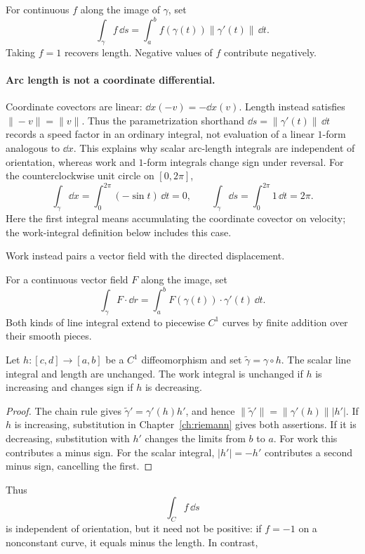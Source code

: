 \begin{definition}
For continuous $f$ along the image of $\gamma$, set
\[
\int_\gamma f\,\dd s
=\int_a^b f(\gamma(t))\|\gamma'(t)\|\,\dd t.
\]
Taking $f=1$ recovers length. Negative values of $f$ contribute negatively.
\end{definition}
\paragraph{Arc length is not a coordinate differential.}
Coordinate covectors are linear: $\dd x(-v)=-\dd x(v)$. Length instead
satisfies $\|-v\|=\|v\|$. Thus the parametrization shorthand
$\dd s=\|\gamma'(t)\|\,\dd t$ records a speed factor in an ordinary
integral, not evaluation of a linear $1$-form analogous to $\dd x$.
This explains why scalar arc-length integrals are independent of orientation,
whereas work and $1$-form integrals change sign under reversal.
For the counterclockwise unit circle on $[0,2\pi]$,
\[
\int_\gamma\dd x=\int_0^{2\pi}(-\sin t)\,\dd t=0,
\qquad \int_\gamma\dd s=\int_0^{2\pi}1\,\dd t=2\pi.
\]
Here the first integral means accumulating the coordinate covector on
velocity; the work-integral definition below includes this case.

Work instead pairs a vector field with the directed displacement.
\begin{definition}
For a continuous vector field $F$ along the image, set
\[
\int_\gamma F\cdot\dd r
=\int_a^b F(\gamma(t))\cdot\gamma'(t)\,\dd t.
\]
Both kinds of line integral extend to piecewise $C^1$ curves by finite
addition over their smooth pieces.
\end{definition}
\begin{proposition}
\label{prop:curve-reparametrization}
Let $h:[c,d]\to[a,b]$ be a $C^1$ diffeomorphism and set
$\widetilde\gamma=\gamma\circ h$. The scalar line integral and length are
unchanged. The work integral is unchanged if $h$ is increasing and changes
sign if $h$ is decreasing.
\end{proposition}
\begin{proof}
The chain rule gives $\widetilde\gamma'=\gamma'(h)h'$, and hence
$\|\widetilde\gamma'\|=\|\gamma'(h)\||h'|$. If $h$ is increasing,
substitution in Chapter~\ref{ch:riemann} gives both assertions. If it is
decreasing, substitution with $h'$ changes the limits from $b$ to $a$.
For work this contributes a minus sign. For the scalar integral,
$|h'|=-h'$ contributes a second minus sign, cancelling the first.
\end{proof}
Thus
\[
\int_C f\,\dd s
\]
 is independent of orientation, but it need not
be positive: if $f=-1$ on a nonconstant curve, it equals minus the length.
In contrast,

